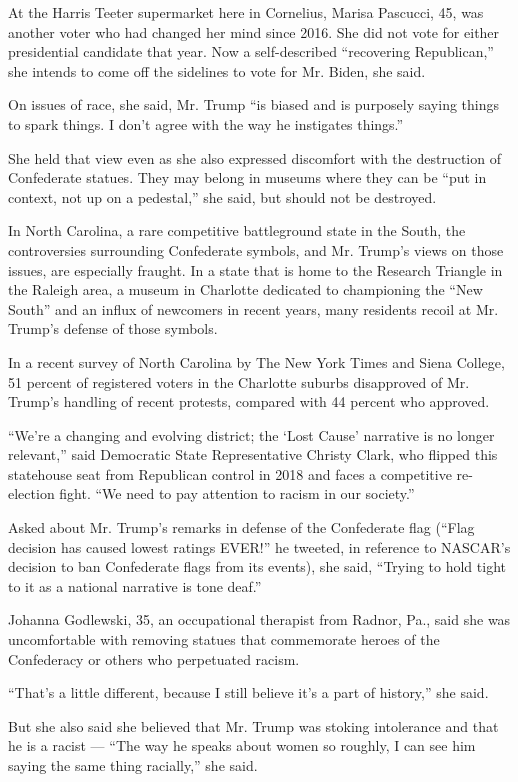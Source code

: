 At the Harris Teeter supermarket here in Cornelius, Marisa Pascucci, 45,
was another voter who had changed her mind since 2016. She did not vote
for either presidential candidate that year. Now a self-described
``recovering Republican,'' she intends to come off the sidelines to vote
for Mr. Biden, she said.

On issues of race, she said, Mr. Trump ``is biased and is purposely
saying things to spark things. I don't agree with the way he instigates
things.''

She held that view even as she also expressed discomfort with the
destruction of Confederate statues. They may belong in museums where
they can be ``put in context, not up on a pedestal,'' she said, but
should not be destroyed.

In North Carolina, a rare competitive battleground state in the South,
the controversies surrounding Confederate symbols, and Mr. Trump's views
on those issues, are especially fraught. In a state that is home to the
Research Triangle in the Raleigh area, a museum in Charlotte dedicated
to championing the ``New South'' and an influx of newcomers in recent
years, many residents recoil at Mr. Trump's defense of those symbols.

In a recent survey of North Carolina by The New York Times and Siena
College, 51 percent of registered voters in the Charlotte suburbs
disapproved of Mr. Trump's handling of recent protests, compared with 44
percent who approved.

``We're a changing and evolving district; the `Lost Cause' narrative is
no longer relevant,'' said Democratic State Representative Christy
Clark, who flipped this statehouse seat from Republican control in 2018
and faces a competitive re-election fight. ``We need to pay attention to
racism in our society.''

Asked about Mr. Trump's remarks in defense of the Confederate flag
(``Flag decision has caused lowest ratings EVER!'' he tweeted, in
reference to NASCAR's decision to ban Confederate flags from its
events), she said, ``Trying to hold tight to it as a national narrative
is tone deaf.''

Johanna Godlewski, 35, an occupational therapist from Radnor, Pa., said
she was uncomfortable with removing statues that commemorate heroes of
the Confederacy or others who perpetuated racism.

``That's a little different, because I still believe it's a part of
history,'' she said.

But she also said she believed that Mr. Trump was stoking intolerance
and that he is a racist --- ``The way he speaks about women so roughly,
I can see him saying the same thing racially,'' she said.

